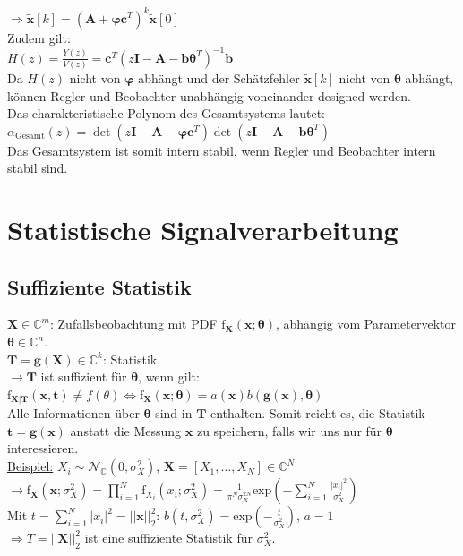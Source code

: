 \documentclass[a4paper,landscape,6pt]{article}
\newcommand{\ma}[1]{\ensuremath{\boldsymbol {#1}}}								%
\renewcommand{\vec}[1]{\ensuremath{\boldsymbol {#1}}}							%
\newcommand{\ul}[1]{\underline{#1}}
\begin{document}
\begin{multicols}{3}
$\Rightarrow \boxed{ \tilde{\vec{x}}[k] = (\ma A + \vec\varphi \vec c^T)^k \tilde{\vec{x}}[0]}$\\

Zudem gilt:\\
$\boxed{H(z) = \frac{Y(z)}{V(z)} = \vec c^T(z\ma I - \ma A - \vec b \vec \theta ^T)^{-1} \vec b}$\\

Da $H(z)$ nicht von $\vec \varphi$ abhängt und der Schätzfehler $\tilde{\vec{x}}[k]$ nicht von $\vec \theta$ abhängt, können Regler und Beobachter unabhängig voneinander designed werden.\\

Das charakteristische Polynom des Gesamtsystems lautet:
$\alpha_{\text{Gesamt}}(z) = \det(z\ma I - \ma A - \vec \varphi \vec c ^T) \det(z\ma I - \ma A - \vec b \vec \theta ^T)$\\
Das Gesamtsystem ist somit intern stabil, wenn Regler und Beobachter intern stabil sind.
\newpage
\section{Statistische Signalverarbeitung}
\subsection*{Suffiziente Statistik}
$\vec X \in \mathbb{C}^m$: Zufallsbeobachtung mit PDF $\text{f}_{\vec X}(\vec x; \vec \theta)$, abhängig vom Parametervektor $\vec \theta \in \mathbb{C}^n$.\\
$\vec T = \vec g(\vec X) \in \mathbb{C}^k$: Statistik.\\

$\rightarrow \vec T$ ist suffizient für $\vec \theta$, wenn gilt:\\
$\boxed{\text{f}_{\vec X|\vec T}(\vec x, \vec t) \neq f(\theta) \Longleftrightarrow \text{f}_{\vec X}(\vec x; \vec \theta) = a(\vec x)b(\vec g(\vec x),\vec \theta)}$\\

Alle Informationen über $\vec \theta$ sind in $\vec T$ enthalten. Somit reicht es, die Statistik $\vec t = \vec g (\vec x)$ anstatt die Messung $\vec x$ zu speichern, falls wir uns nur für $\vec \theta$ interessieren.\\

\ul{Beispiel:} $X_i \sim \mathcal{N}_{\mathbb{C}}(0,\sigma_X^2)$, $\vec X = [X_1,\dots,X_N] \in \mathbb{C}^N$\\
$\rightarrow \text{f}_{\vec X}(\vec x; \sigma_X^2) = \prod\limits_{i=1}^N \text{f}_{X_i}(x_i; \sigma_X^2) =\frac{1}{\pi^N\sigma_X^{2N}} \text{exp}\left(-\sum\limits_{i=1}^{N} \frac{|x_i|^2}{\sigma_X^2}\right)$\\
Mit $t= \sum_{i=1}^{N}|x_i|^2 = ||\vec x||_2^2$:  $b(t,\sigma_X^2 ) = \text{exp}(-\frac{t}{\sigma_X^2})$, $a=1$\\
$\Rightarrow T = ||\vec X||_2^2$ ist eine suffiziente Statistik für $\sigma_X^2$.

\end{multicols}
\end{document}
